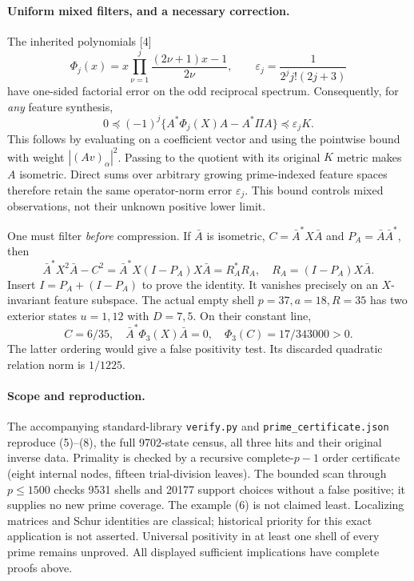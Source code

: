 \documentclass[10pt,a4paper]{article}
\begin{document}
\paragraph{Uniform mixed filters, and a necessary correction.}
The inherited polynomials [4]
\[
 \Phi_j(x)=x\prod_{\nu=1}^j\frac{(2\nu+1)x-1}{2\nu},\qquad
 \varepsilon_j=\frac1{2^jj!(2j+3)}
\]
have one-sided factorial error on the odd reciprocal spectrum. Consequently,
for \emph{any} feature synthesis,
\[
 0\preceq(-1)^j\{A^*\Phi_j(X)A-A^*\Pi A\}
       \preceq\varepsilon_jK.\tag{9}
\]
This follows by evaluating on a coefficient vector and using the pointwise
bound with weight $|(Av)_\alpha|^2$. Passing to the quotient with its original
$K$ metric makes $A$ isometric. Direct sums over arbitrary growing prime-indexed
feature spaces therefore retain the same operator-norm error $\varepsilon_j$.
This bound controls mixed observations, not their unknown positive lower limit.

One must filter \emph{before} compression. If $\bar A$ is isometric,
$C=\bar A^*X\bar A$ and $P_A=\bar A\bar A^*$, then
\[
 \bar A^*X^2\bar A-C^2
 =\bar A^*X(I-P_A)X\bar A=R_A^*R_A,\quad R_A=(I-P_A)X\bar A.
\]
Insert $I=P_A+(I-P_A)$ to prove the identity. It vanishes precisely on an
$X$-invariant feature subspace. The actual empty shell $p=37,a=18,R=35$
has two exterior states $u=1,12$ with $D=7,5$. On their constant line,
\[
 C=6/35,\quad \bar A^*\Phi_3(X)\bar A=0,
 \quad \Phi_3(C)=17/343000>0.
\]
The latter ordering would give a false positivity test. Its discarded quadratic
relation norm is $1/1225$.

\paragraph{Scope and reproduction.}
The accompanying standard-library \texttt{verify.py} and
\texttt{prime\_certificate.json} reproduce (5)--(8), the full 9702-state
census, all three hits and their original inverse data. Primality is checked by
a recursive complete-$p-1$ order certificate (eight internal nodes, fifteen
trial-division leaves). The bounded scan through $p\le1500$ checks 9531 shells
and 20177 support choices without a false positive; it supplies no new prime
coverage. The example (6) is not claimed least. Localizing matrices and Schur
identities are classical; historical priority for this exact application is not
asserted. Universal positivity in at least one shell of every prime remains
unproved. All displayed sufficient implications have complete proofs above.
\end{document}
